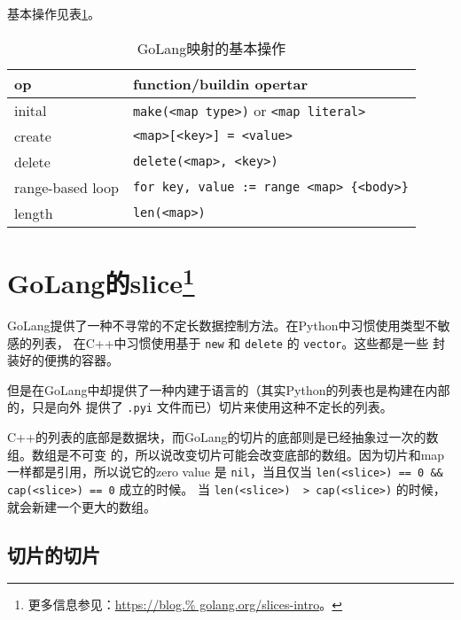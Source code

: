 基本操作见表\ref{golang::basic map op}。

\begin{table}
    \centering
    \begin{tabular}{ll}
    \toprule
    op               & function/buildin opertar                          \\
    \midrule
    inital           & \verb|make(<map type>)| or \verb|<map literal>|   \\
    create           & \verb|<map>[<key>] = <value>|                     \\
    delete           & \verb|delete(<map>, <key>)|                       \\
    range-based loop & \verb|for key, value := range <map> {<body>}|     \\
    length           & \verb|len(<map>)|                                 \\
    \bottomrule
    \end{tabular}
    \caption{GoLang映射的基本操作}
    \label{golang::basic map op}
\end{table}


\section[GoLang的slice]{GoLang的slice\footnote{更多信息参见：\url{https://blog.%
golang.org/slices-intro}。}}

GoLang提供了一种不寻常的不定长数据控制方法。在Python中习惯使用类型不敏感的列表，
在C++中习惯使用基于 \verb|new| 和 \verb|delete| 的 \verb|vector|。这些都是一些
封装好的便携的容器。

但是在GoLang中却提供了一种内建于语言的（其实Python的列表也是构建在内部的，只是向外
提供了 \verb|.pyi| 文件而已）切片来使用这种不定长的列表。

C++的列表的底部是数据块，而GoLang的切片的底部则是已经抽象过一次的数组。数组是不可变
的，所以说改变切片可能会改变底部的数组。因为切片和map一样都是引用，所以说它的zero value
是 \verb|nil|，当且仅当 \verb|len(<slice>) == 0 && cap(<slice>) == 0| 成立的时候。
当 \verb|len(<slice>)  > cap(<slice>)| 的时候，就会新建一个更大的数组。

\subsection{切片的切片}

